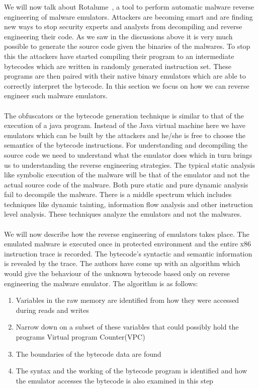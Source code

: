 \documentclass[11pt]{article}
\begin{document}
		We will now talk about Rotalume~\cite{rotalumegatech}, a tool to perform automatic malware reverse engineering of malware emulators. Attackers are becoming smart and are finding new ways to stop security experts and analysts from decompiling and reverse engineering their code. As we saw in the discussions above it is very much possible to generate the source code given the binaries of the malwares. To stop this the attackers have started compiling their program to an intermediate bytecodes which are written in randomly generated instruction set. These programs are then paired with their native binary emulators which are able to correctly interpret the bytecode. In this section we focus on how we can reverse engineer such malware emulators.\\ \\	
		The obfuscators or the bytecode generation technique is similar to that of the execution of a java program. Instead of the Java virtual machine here we have emulators which can be built by the attackers and he/she is free to choose the semantics of the bytecode  instructions. For understanding and decompiling the source code we need to understand what the emulator does which in turn brings us to understanding the reverse engineering strategies. The typical static analysis like symbolic execution of the malware will be that of the emulator and not the actual source code of the malware. Both pure static and pure dynamic analysis fail to decompile the malware. There is a middle spectrum which includes techniques like dynamic tainting, information flow analysis and other instruction level analysis. These techniques analyze the emulators and not the malwares.\\ \\	
		We will now describe how the reverse engineering of emulators takes place. The emulated malware is executed once in protected environment and the entire x86 instruction trace is recorded. The bytecode’s syntactic and semantic information is revealed by the trace. The authors have come up with an algorithm which would give the behaviour of the unknown bytecode based only on reverse engineering the malware emulator. The algorithm is as follows:
		\begin{enumerate}
			\item Variables in the raw memory are identified from how they were accessed during reads and writes
			\item Narrow down on a subset of these variables that could possibly hold the programs Virtual program Counter(VPC)
			\item The boundaries of the bytecode data are found
			\item The syntax and  the working of the bytecode program is identified and how the emulator accesses the bytecode is also examined in this step
		\end{enumerate}
		
\end{document}
